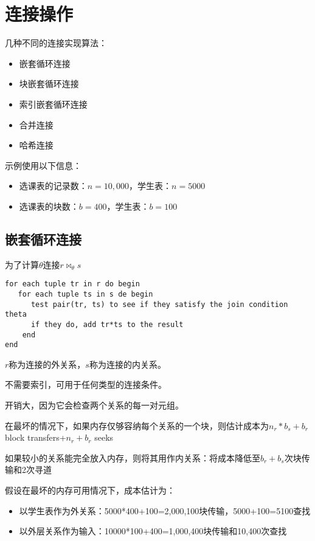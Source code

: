 \section{连接操作}

几种不同的连接实现算法：
\begin{itemize}
    \item 嵌套循环连接
    \item 块嵌套循环连接
    \item 索引嵌套循环连接
    \item 合并连接
    \item 哈希连接
\end{itemize}

示例使用以下信息：
\begin{itemize}
    \item 选课表的记录数：$n=10,000$，学生表：$n=5000$
    \item 选课表的块数：$b=400$，学生表：$b=100$
\end{itemize}

\subsection{嵌套循环连接}

为了计算$\theta$连接$r\Join_{\theta}s$
\begin{lstlisting}[style=sqlstyle]
for each tuple tr in r do begin
   for each tuple ts in s de begin
      test pair(tr, ts) to see if they satisfy the join condition theta
      if they do, add tr*ts to the result
    end
end    
\end{lstlisting}

$r$称为连接的外关系，$s$称为连接的内关系。

不需要索引，可用于任何类型的连接条件。

开销大，因为它会检查两个关系的每一对元组。

在最坏的情况下，如果内存仅够容纳每个关系的一个块，则估计成本为$n_r*b_s+b_r$ block transfers+$n_r+b_r$ seeks

如果较小的关系能完全放入内存，则将其用作内关系：将成本降低至$b_r+b_s$次块传输和2次寻道

假设在最坏的内存可用情况下，成本估计为：
\begin{itemize}
    \item 以学生表作为外关系：5000*400+100=2,000,100块传输，5000+100=5100查找
    \item 以外层关系作为输入：10000*100+400=1,000,400块传输和10,400次查找
\end{itemize}

